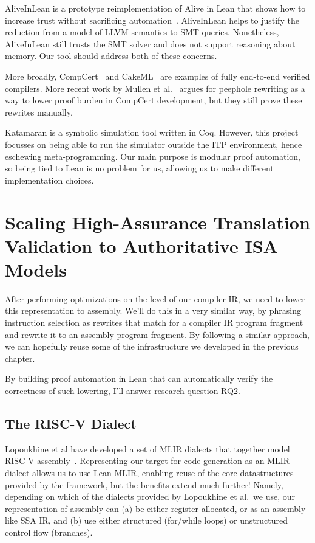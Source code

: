 \documentclass[a4paper]{scrartcl}
\begin{document}
AliveInLean is a prototype reimplementation of Alive in Lean that shows how to increase trust without
sacrificing automation~\cite{leeAliveInLeanVerifiedLLVM2019}. AliveInLean helps to justify the reduction from a model of LLVM semantics
to SMT queries. Nonetheless, AliveInLean still trusts the SMT solver and does not support reasoning about memory. 
Our tool should address both of these concerns.

More broadly, CompCert~\cite{leroyCompCertFormallyVerified} and
CakeML~\cite{kumarCakeMLVerifiedImplementation2014} are examples
of fully end-to-end verified compilers. More recent work by Mullen et
al.~\cite{mullenVerifiedPeepholeOptimizations2016} argues for
peephole rewriting as a way to lower proof burden in CompCert
development, but they still prove these rewrites manually.

Katamaran \cite{keuchelVerifiedSymbolicExecution2022} is a
symbolic simulation tool written in Coq. However, this
project focusses on being able to run the simulator outside the ITP
environment, hence eschewing meta-programming. Our main purpose is
modular proof automation, so being tied to Lean is no problem for us,
allowing us to make different implementation choices.

\section{Scaling High-Assurance Translation Validation to
Authoritative ISA
Models}\label{scaling-high-assurance-translation-validation-to-authoritative-isa-models}

After performing optimizations on the level of our compiler IR, we need
to lower this representation to assembly. We'll do this in a very
similar way, by phrasing instruction selection as rewrites that match
for a compiler IR program fragment and rewrite it to an assembly program
fragment. By following a similar approach, we can hopefully reuse some
of the infrastructure we developed in the previous chapter.

By building proof automation in Lean that can automatically verify the correctness of
such lowering, I'll answer research question \textsc{RQ2}.

\subsection{The RISC-V Dialect}\label{the-risc-v-dialect}

Lopoukhine et al have developed a set of MLIR
dialects that together model RISC-V assembly~\cite{lopoukhineMultiLevelCompilerBackend}. Representing our target
for code generation as an MLIR dialect allows us to use Lean-MLIR,
enabling reuse of the core datastructures provided by the framework, but
the benefits extend much further! Namely, depending on which of the
dialects provided by Lopoukhine et al.~we use, our representation of
assembly can (a) be either register allocated, or as an assembly-like
SSA IR, and (b) use either structured (for/while loops) or unstructured
control flow (branches).
\end{document}
